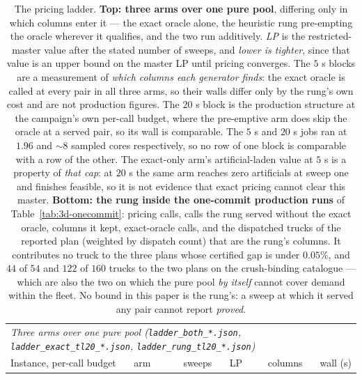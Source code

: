\begin{table}[!htbp]
\centering
\small
\caption{The pricing ladder. \textbf{Top: three arms over one pure
pool}, differing only in which columns enter it --- the exact oracle
alone, the heuristic rung pre-empting the oracle wherever it qualifies,
and the two run additively. \emph{LP} is the restricted-master value
after the stated number of sweeps, and \emph{lower is tighter}, since
that value is an upper bound on the master LP until pricing converges.
The $5$ s blocks are a measurement of \emph{which columns each generator
finds}: the exact oracle is called at every pair in all three arms, so
their walls differ only by the rung's own cost and are not production
figures. The $20$ s block is the production structure at the campaign's
own per-call budget, where the pre-emptive arm does skip the oracle at a
served pair, so its wall is comparable. The $5$ s and $20$ s jobs ran at
$1.96$ and ${\sim}8$ sampled cores respectively, so no row of one block
is comparable with a row of the other. The exact-only arm's
artificial-laden value at $5$ s is a property of \emph{that cap}: at
$20$ s the same arm reaches zero artificials at sweep one and finishes
feasible, so it is not evidence that exact pricing cannot clear this
master. \textbf{Bottom: the rung inside the one-commit production runs} of
Table~\ref{tab:3d-onecommit}: pricing calls, calls the rung served
without the exact oracle, columns it kept, exact-oracle calls, and the
dispatched trucks of the reported plan (weighted by dispatch count) that
are the rung's columns. It contributes no truck to the three plans whose
certified gap is under $0.05\%$, and $44$ of $54$ and $122$ of $160$
trucks to the two plans on the crush-binding catalogue --- which are
also the two on which the pure pool \emph{by itself} cannot cover demand
within the fleet. No bound in this paper is the rung's: a sweep at which
it served any pair cannot report \emph{proved}.}
\label{tab:ladder}
\begin{tabular}{llrrrr}
\toprule
\multicolumn{6}{l}{\emph{Three arms over one pure pool
(\texttt{ladder\_both\_*.json}, \texttt{ladder\_exact\_tl20\_*.json},
\texttt{ladder\_rung\_tl20\_*.json})}} \\
Instance, per-call budget & arm & sweeps & LP & columns & wall (s) \\
\midrule

\end{tabular}
\end{table}

